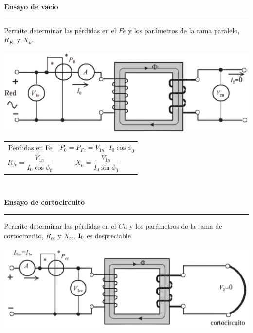 \documentclass[11pt,a4paper]{article}
\newcommand{\fasor}[1]{\uppercase{\textbf{#1}}}
\newcommand{\subtitulo}[1]{
	\textbf{#1} \\ \vspace{.1cm} {\color{gray} \hrule}
}
\begin{document}
\begin{cajita}
	\begin{multicols}{2}
	\subtitulo{Ensayo de vacío}	
	
	
		\begin{flushleft}
			Permite determinar las pérdidas en el $Fe$
			y los parámetros de la rama paralelo, $R_{Fe}$ y $X_\mu$.
		\end{flushleft}
	
			\includegraphics[width=\linewidth]{ensayo-vacio}\\ \vspace{.3cm}
			
			
			\begin{tabular}{c c}
					Pérdidas en Fe & $P_0 = P_{Fe} = V_{1n}\cdot I_0 \cos \phi_0$\vspace{.3cm} \\ 
					$ R_{fe}=\dfrac{V_{1n}}{I_{0} \cos \phi_0} $ &$X_{\mu}=\dfrac{V_{1n}}{I_{0}\sin \phi_0}$\\
			\end{tabular}\\
		
			
			\newpage %
			
	\subtitulo{Ensayo de cortocircuito}
		
		\begin{flushleft}
			Permite determinar las pérdidas en el $Cu$ y los parámetros de la rama de cortocircuito,  $R_{cc}$ y $X_{cc}$. $\fasor{I}_{0}$ es despreciable.
		\end{flushleft}
		
			\includegraphics[width=\linewidth]{ensayo-cc}\\ \vspace{.1cm}
			

\end{multicols}
\end{cajita}
\end{document}
